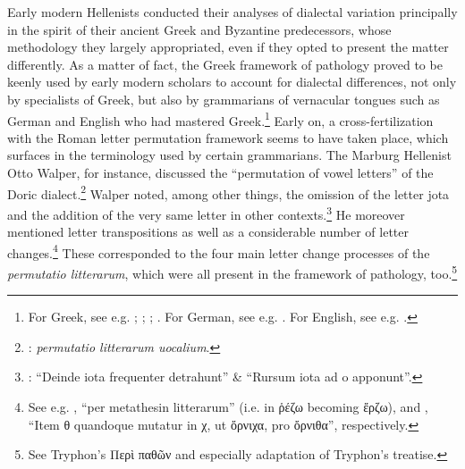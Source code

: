 Early modern Hellenists conducted their analyses of dialectal variation principally in the spirit of their ancient Greek and Byzantine predecessors, whose methodology they largely appropriated, even if they opted to present the matter differently. As a matter of fact, the Greek framework of pathology proved to be keenly used by early modern scholars to account for dialectal differences, not only by specialists of Greek, but also by grammarians of vernacular tongues such as German and English who had mastered Greek.\footnote{{For Greek, see e.g. \citet[b.iv\textsc{\textsuperscript{v}}]{Melanchthon1518}; \citet[{7}{\textsc{\textsuperscript{v}}}{–11}{\textsc{\textsuperscript{v}}}]{Baile1588}; \citet[11]{Schmidt1604}; \citet[2–8, 20–22]{Hill1658}. For German, see e.g. \citet{Wolf1578}. For English, see e.g. \citet[130--133]{Gill1619}.}} Early on, a cross-fertilization with the Roman letter permutation framework seems to have taken place, which surfaces in the terminology used by certain grammarians. The Marburg Hellenist Otto Walper, for instance, discussed the “permutation of vowel letters” of the Doric dialect.\footnote{{\citet[62]{Walper1589}:} {\textit{permutatio litterarum uocalium}}.} Walper noted, among other things, the omission of the letter jota and the addition of the very same letter in other contexts.\footnote{{\citet[63]{Walper1589}: “Deinde iota frequenter detrahunt” \& “Rursum iota ad o apponunt”.}} He moreover mentioned letter transpositions as well as a considerable number of letter changes.\footnote{{See e.g. \citet[63]{Walper1589}, “per metathesin litterarum” (i.e. in ῥέζω becoming ἔρζω), and \citet[64]{Walper1589}, “Item θ quandoque mutatur in χ, ut ὄρνιχα, pro ὄρνιθα”, respectively.}} These corresponded to the four main letter change processes of the \textit{permutatio litterarum}, which were all present in the framework of pathology, too.\footnote{{See Tryphon’s Περὶ παθῶν and especially \citet[\textsc{p.}{iv}{\textsc{\textsuperscript{v}}}]{Amerot1520} adaptation of Tryphon’s  treatise.}}

